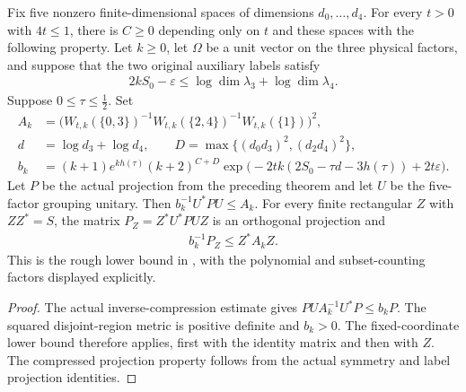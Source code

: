 \begin{theorem}
  \label{thm:actual_low_defect_rough_lower_bound}
  \leanok
  Fix five nonzero finite-dimensional spaces of dimensions $d_0,\ldots,d_4$.
  For every $t>0$ with $4t\leq1$, there is $C\geq0$ depending only on
  $t$ and these spaces with the following property.
  Let $k\geq0$, let $\Omega$ be a unit vector on the three physical
  factors, and suppose that the two original auxiliary labels satisfy
  \begin{align}
    2kS_0-\varepsilon\leq\log\dim\lambda_3+\log\dim\lambda_4.
  \end{align}
  Suppose $0\leq\tau\leq\tfrac12$. Set
  \begin{align}
    A_k&=\bigl(W_{t,k}(\{0,3\})^{-1}W_{t,k}(\{2,4\})^{-1}
                W_{t,k}(\{1\})\bigr)^2,\\
    d&=\log d_3+\log d_4,\qquad D=\max\{(d_0d_3)^2,(d_2d_4)^2\},\\
    b_k&=(k+1)e^{kh(\tau)}(k+2)^{C+D}
      \exp\bigl(-2tk(2S_0-\tau d-3h(\tau))+2t\varepsilon\bigr).
  \end{align}
  Let $P$ be the actual projection from the preceding theorem and
  let $U$ be the five-factor grouping unitary. Then
  $b_k^{-1}U^*PU\leq A_k$. For every finite rectangular $Z$ with
  $ZZ^*=S$, the matrix $P_Z=Z^*U^*PUZ$ is an orthogonal projection and
  \begin{align}
    b_k^{-1}P_Z\leq Z^*A_kZ.
  \end{align}
  This is the rough lower bound in \cite[Section~8]{OpenAI2026AreaLaw},
  with the polynomial and subset-counting factors displayed explicitly.
\end{theorem}
\begin{proof}\leanok
  The actual inverse-compression estimate gives
  $PUA_k^{-1}U^*P\leq b_kP$. The squared disjoint-region metric is
  positive definite and $b_k>0$. The fixed-coordinate lower bound
  therefore applies, first with the identity matrix and then with $Z$.
  The compressed projection property follows from the actual symmetry
  and label projection identities.
\end{proof}
